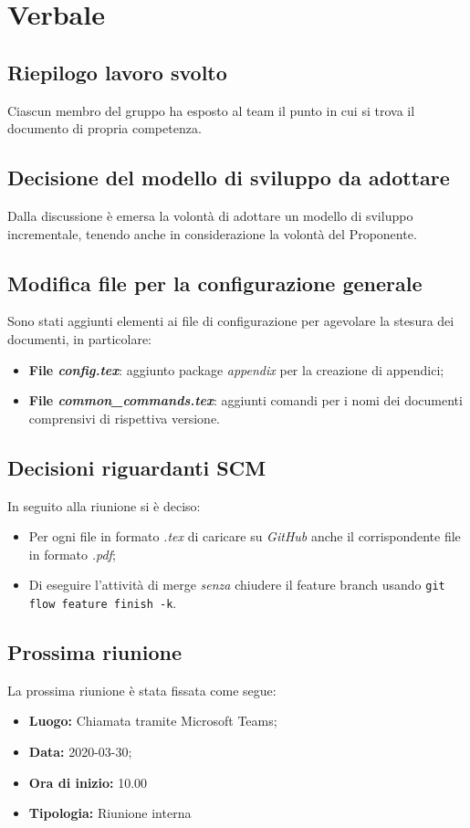 \section{Verbale}
	
	\subsection{Riepilogo lavoro svolto}
		Ciascun membro del gruppo ha esposto al team il punto in cui si trova il documento di propria competenza.
		
	\subsection{Decisione del modello di sviluppo da adottare}
	Dalla discussione è emersa la volontà di adottare un modello di sviluppo incrementale, tenendo anche in considerazione la volontà del Proponente.
	
	\subsection{Modifica file per la configurazione generale}
	Sono stati aggiunti elementi ai file di configurazione per agevolare la stesura dei documenti, in particolare:
	\begin{itemize}
		\item{\textbf{File \textit{config.tex}}: aggiunto package \textit{appendix} per la creazione di appendici;}
		\item{\textbf{File \textit{common\_commands.tex}}: aggiunti comandi per i nomi dei documenti comprensivi di rispettiva versione.}
	\end{itemize}
	
	\subsection{Decisioni riguardanti SCM}
	In seguito alla riunione si è deciso:
	\begin{itemize}
		\item{Per ogni file in formato \textit{.tex} di caricare su \textit{GitHub} anche il corrispondente file in formato \textit{.pdf};}
		\item{Di eseguire l'attività di merge \textit{senza} chiudere il feature branch usando \texttt{git flow feature finish -k}.}
	\end{itemize}
		
	\subsection{Prossima riunione}
		La prossima riunione è stata fissata come segue: 
		\begin{itemize}
			\item \textbf{Luogo: } Chiamata tramite Microsoft Teams; 
			\item \textbf{Data: } 2020-03-30; 
			\item \textbf{Ora di inizio: } 10.00
			\item \textbf{Tipologia: } Riunione interna
		\end{itemize}